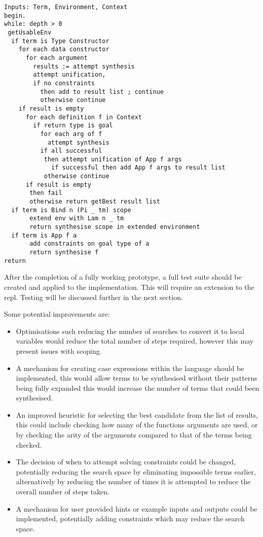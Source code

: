 \documentclass[a4paper]{article}
\begin{document}
\begin{center}
\begin{verbatim}
Inputs: Term, Environment, Context
begin.
while: depth > 0
 getUsableEnv
  if term is Type Constructor 
	for each data constructor 
	  for each argument
		results := attempt synthesis
		attempt unification, 
		if no constraints 
		  then add to result list ; continue 
		  otherwise continue
	if result is empty 
	  for each definition f in Context
		if return type is goal
		  for each arg of f
			attempt synthesis
		  if all successful
		   then attempt unification of App f args
			 if successful then add App f args to result list
		   otherwise continue
	  if result is empty 
	   then fail
	   otherwise return getBest result list
  if term is Bind n (Pi _ tm) scope
	   extend env with Lam n _ tm
	   return synthesise scope in extended environment
  if term is App f a
	   add constraints on goal type of a
	   return synthesise f 
return
\end{verbatim}
\end{center}

After the completion of a fully working prototype, a full test suite should be created and applied to the implementation.
This will require an extension to the repl.
Testing will be discussed further in the next section. 

Some potential improvements are:

\begin{itemize}
\item Optimisations such reducing the number of searches to convert it to local variables would reduce the total number
of steps required, however this may present issues with scoping.

\item A mechanism for creating case expressions within the language should be implemented, this would 
allow terms to be synthesised without their patterns being fully expanded this would increase the number of terms that could been
synthesised.

\item An improved heuristic for selecting the best candidate from the list of results, this could include checking how many of the functions arguments 
are used, or by checking the arity of the arguments compared to that of the terms being checked.

\item The decision of when to attempt solving constraints could be changed, potentially reducing the search space by eliminating impossible 
terms earlier, alternatively by reducing the number of times it is attempted to reduce the overall number of steps taken.

\item A mechanism for user provided hints or example inputs and outputs could be implemented, potentially adding constraints which may
reduce the search space.
\end{itemize}
\end{document}

